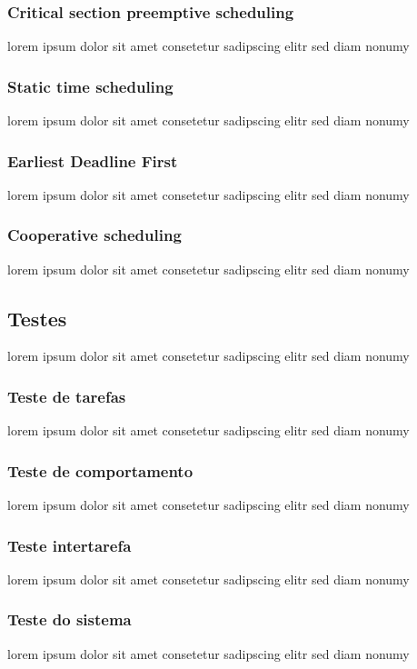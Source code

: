 \subsubsection{Critical section preemptive scheduling}
lorem ipsum dolor sit amet consetetur sadipscing elitr sed diam nonumy

\subsubsection{Static time scheduling}
lorem ipsum dolor sit amet consetetur sadipscing elitr sed diam nonumy

\subsubsection{Earliest Deadline First}
lorem ipsum dolor sit amet consetetur sadipscing elitr sed diam nonumy

\subsubsection{Cooperative scheduling}
lorem ipsum dolor sit amet consetetur sadipscing elitr sed diam nonumy


\subsection{Testes}
lorem ipsum dolor sit amet consetetur sadipscing elitr sed diam nonumy

\subsubsection{Teste de tarefas}
lorem ipsum dolor sit amet consetetur sadipscing elitr sed diam nonumy

\subsubsection{Teste de comportamento}
lorem ipsum dolor sit amet consetetur sadipscing elitr sed diam nonumy

\subsubsection{Teste intertarefa}
lorem ipsum dolor sit amet consetetur sadipscing elitr sed diam nonumy

\subsubsection{Teste do sistema}
lorem ipsum dolor sit amet consetetur sadipscing elitr sed diam nonumy
